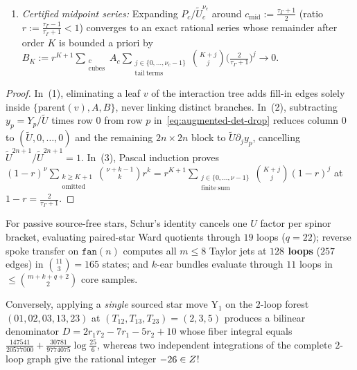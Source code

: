 \begin{theorem}
\begin{enumerate}[label=(\arabic*),leftmargin=*]
  \item \emph{Certified midpoint series:} Expanding $P_c/\widetilde{U}_c^{\nu_c}$ around $c_{\mathrm{mid}} := \frac{\tau_\Gamma+1}{2}$ (ratio $r := \frac{\tau_\Gamma-1}{\tau_\Gamma+1} < 1$) converges to an exact rational series whose remainder after order $K$ is bounded a priori by $B_K := r^{K+1}\sum_{\substack{c\\\mathrm{cubes}}}A_c\sum_{\substack{j\in\{0,\dots,\nu_c-1\}\\\mathrm{tail\ terms}}}\binom{K+j}{j}\bigl(\frac{2}{\tau_\Gamma+1}\bigr)^j \to 0$.
\end{enumerate}
\end{theorem}

\begin{proof}
In~(1), eliminating a leaf $v$ of the interaction tree adds fill-in edges solely inside $\{\mathrm{parent}(v), A, B\}$, never linking distinct branches. In~(2), subtracting $y_p = Y_p/\widetilde{U}$ times row $0$ from row $p$ in~\eqref{eq:augmented-det-drop} reduces column $0$ to $(\widetilde{U},0,\dots,0)$ and the remaining $2n\times 2n$ block to $\widetilde{U}\partial_j y_p$, cancelling $\widetilde{U}^{2n+1}/\widetilde{U}^{2n+1} = 1$. In~(3), Pascal induction proves $(1-r)^\nu\sum_{\substack{k\ge K+1\\\mathrm{omitted}}}\binom{\nu+k-1}{k}r^k = r^{K+1}\sum_{\substack{j\in\{0,\dots,\nu-1\}\\\mathrm{finite\ sum}}}\binom{K+j}{j}(1-r)^j$ at $1-r = \frac{2}{\tau_\Gamma+1}$.
\end{proof}

\begin{example}
\label{ex:local-log-vs-global-int}
For passive source-free stars, Schur's identity cancels one $U$ factor per spinor bracket, evaluating paired-star Ward quotients through $19$ loops ($q=22$); reverse spoke transfer on $\texttt{fan}(n)$ computes all $m \le 8$ Taylor jets at \textbf{$128$ loops} ($257$ edges) in $\binom{11}{3} = 165$ states; and $k$-ear bundles evaluate through $11$ loops in $\le\binom{m+k+q+2}{2}$ core samples.

Conversely, applying a \emph{single} sourced star move $\mathrm{Y}_1$ on the $2$-loop forest $(01,02,03,13,23)$ at $(T_{12},T_{13},T_{23}) = (2,3,5)$ produces a bilinear denominator $D = 2r_1 r_2 - 7r_1 - 5r_2 + 10$ whose fiber integral equals $\frac{147541}{20577000} + \frac{30781}{9774075}\log\frac{25}{6}$, whereas two independent integrations of the complete $2$-loop graph give the rational integer $-26 \in Z$!
\end{example}

